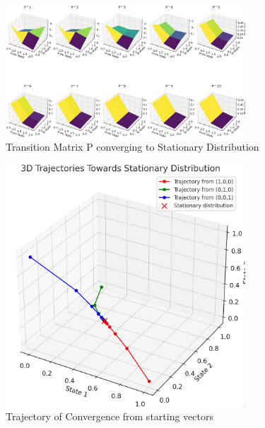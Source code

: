 \documentclass[a4paper]{article}
\begin{document}
\begin{figure}[H]
  \centering
  \includegraphics[width=0.8\textwidth]{assets/transition_matrix_convergence_stationary.png}
  \caption{Transition Matrix P converging to Stationary Distribution}
  \label{fig:transition_matrix_convergence_stationary}
\end{figure}

\begin{figure}[H]
  \centering
  \includegraphics[width=0.8\textwidth]{assets/convergence_to_stationary_distribution.png}
  \caption{Trajectory of Convergence from starting vectors}
  \label{fig:convergence_to_stationary_distribution}
\end{figure}
\end{document}
